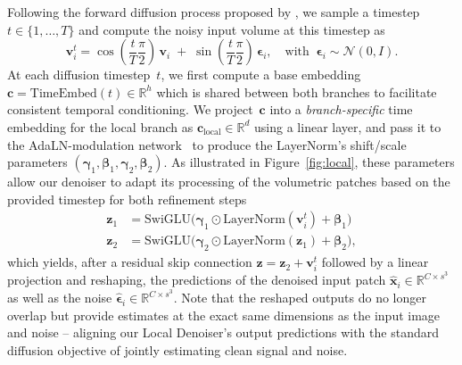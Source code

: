 Following the forward diffusion process proposed by \citet{zhang2023improving}, we sample a timestep $t\in\{1,\dots,T\}$ and compute the noisy input volume at this timestep as
\begin{equation}
    \boldsymbol{v}_i^t = \cos(\frac{t}{T} \frac{\pi}{2})\,\boldsymbol{v}_i \;+\;\sin(\frac{t}{T} \frac{\pi}{2})\,\boldsymbol{\epsilon}_i,\quad \text{with} \;\;
  \boldsymbol{\epsilon}_i\sim\mathcal{N}(0,I).
\end{equation}
At each diffusion timestep~$t$, we first compute a base embedding~$\boldsymbol{c}\!=\!\mathrm{TimeEmbed}(t)\in\mathbb{R}^h$ which is shared between both branches to facilitate consistent temporal conditioning. We project~$\boldsymbol{c}$ into a \emph{branch-specific} time embedding for the local branch as $\boldsymbol{c}_{\mathrm{local}}\in\mathbb{R}^d$ using a linear layer, and pass it to the AdaLN-modulation network~\citep{Peebles2022DiT} to produce the LayerNorm's shift/scale parameters $(\boldsymbol{\gamma}_1,\boldsymbol{\beta}_1,\boldsymbol{\gamma}_2,\boldsymbol{\beta}_2)$. As illustrated in Figure~\ref{fig:local}, these parameters allow our denoiser to adapt its processing of the volumetric patches based on the provided timestep for both refinement steps
\begin{equation}
    \begin{aligned}
  \boldsymbol{z}_1 &= \mathrm{SwiGLU}\bigl(\boldsymbol{\gamma}_1\odot\mathrm{LayerNorm}(\boldsymbol{v}_i^t)+\boldsymbol{\beta}_1\bigr)\\
  \boldsymbol{z}_2 &= \mathrm{SwiGLU}\bigl(\boldsymbol{\gamma}_2\odot\mathrm{LayerNorm}(\boldsymbol{z}_1)+\boldsymbol{\beta}_2\bigr),
\end{aligned}
\end{equation}
which yields, after a residual skip connection $\boldsymbol{z}=\boldsymbol{z}_2+\boldsymbol{v}_i^t$ followed by a linear projection and reshaping, the predictions of the denoised input patch $\hat{\boldsymbol{x}}_i\in\mathbb{R}^{C\times s^3}$ as well as the noise $\hat{\boldsymbol{\epsilon}}_i\in\mathbb{R}^{C\times s^3}$. Note that the reshaped outputs do no longer overlap but provide estimates at the exact same dimensions as the input image and noise -- aligning our Local Denoiser's output predictions with the standard diffusion objective of jointly estimating clean signal and noise. 


